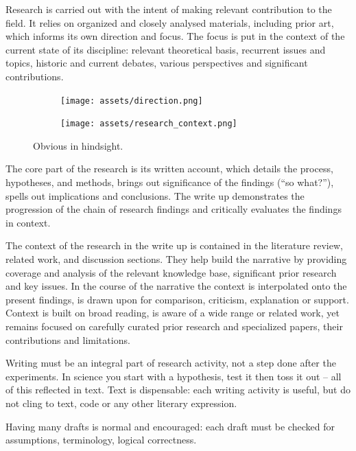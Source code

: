 \documentclass[10pt,a4paper,twocolumn]{article}
\begin{document}
Research is carried out with the intent of making relevant contribution to the field. It
relies on organized and closely analysed materials, including prior art, which informs
its own direction and focus. The focus is put in the context of the current state of its
discipline: relevant theoretical basis, recurrent issues and topics, historic and current
debates, various perspectives and significant contributions.
\begin{figure}
  \centering
  \begin{subfigure}
    \centering
    \texttt{[image: assets/direction.png]}
  \end{subfigure}%
  \begin{subfigure}
    \centering
    \texttt{[image: assets/research\_context.png]}
  \end{subfigure}
  \caption{
    Obvious in hindsight.
  }
  \label{fig:direction}
\end{figure}

The core part of the research is its written account, which details the process, hypotheses,
and methods, brings out significance of the findings (``so what?''), spells out implications
and conclusions. The write up demonstrates the progression of the chain of research findings
and critically evaluates the findings in context.

The context of the research in the write up is contained in the literature review, related
work, and discussion sections. They help build the narrative by providing coverage and
analysis of the relevant knowledge base, significant prior research and key issues. In the
course of the narrative the context is interpolated onto the present findings, is drawn
upon for comparison, criticism, explanation or support. Context is built on broad reading,
is aware of a wide range or related work, yet remains focused on carefully curated prior
research and specialized papers, their contributions and limitations.

Writing must be an integral part of research activity, not a step done after the experiments.
In science you start with a hypothesis, test it then toss it out -- all of this reflected
in text. Text is dispensable: each writing activity is useful, but do not cling to text,
code or any other literary expression.

Having many drafts is normal and encouraged: each draft must be checked for assumptions,
terminology, logical correctness.
\end{document}
